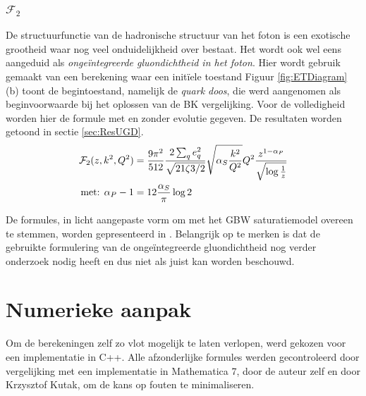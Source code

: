 \documentclass[a4paper,11pt]{article}
\numberwithin{equation}{section} %
\begin{document}
    \subsubsection{$\mathcal{F}_2$} \label{sec:UGD}
De structuurfunctie van de hadronische structuur van het foton is een exotische grootheid waar nog veel onduidelijkheid over bestaat.
Het wordt ook wel eens aangeduid als \textit{ongeïntegreerde gluondichtheid in het foton}.
Hier wordt gebruik gemaakt van een berekening waar een initïele toestand %
Figuur \ref{fig:ETDiagram} (b) toont de begintoestand, namelijk de \textit{quark doos}, die werd aangenomen als beginvoorwaarde bij het oplossen van de BK vergelijking.
Voor de volledigheid worden hier de formule met en zonder evolutie gegeven.
De resultaten worden getoond in sectie \ref{sec:ResUGD}.
\begin{align} \label{eq:UGD}
\mathcal{F}_2(z,k^2,Q^2) &= \frac{9\pi^2}{512} \frac{2\sum_q e_q^2}{\sqrt{21\zeta{3}/2}} \sqrt{\alpha_S \frac{k^2}{Q^2}} Q^2 \frac{z^{1-\alpha_P}}{\sqrt{\log{\frac{1}{z}}}} \\
\text{met: } \alpha_P -1 &=  12  \frac{\alpha_S}{\pi} \log{2} \notag
\end{align}

De formules, in licht aangepaste vorm om met het GBW saturatiemodel overeen te stemmen, worden gepresenteerd in \cite{F0}.
Belangrijk op te merken is dat de gebruikte formulering van de ongeïntegreerde gluondichtheid nog verder onderzoek nodig heeft en dus niet als juist kan worden beschouwd.

\section{Numerieke aanpak}
Om de berekeningen zelf zo vlot mogelijk te laten verlopen, werd gekozen voor een implementatie in C++.
Alle afzonderlijke formules werden gecontroleerd door vergelijking met een implementatie in Mathematica 7, door de auteur zelf en door Krzysztof Kutak, om de kans op fouten te minimaliseren.
\end{document}
